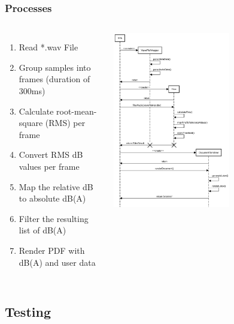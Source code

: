 \begin{frame}
    \frametitle{Processes}
    \begin{columns}
            \begin{enumerate}
                \item Read *.wav File
                \item Group samples into frames (duration of 300ms)
                \item Calculate root-mean-square (RMS) per frame
                \item Convert RMS dB values per frame
                \item Map the relative dB to absolute dB(A)
                \item Filter the resulting list of dB(A)
                \item Render PDF with dB(A) and user data
            \end{enumerate}
            \includegraphics[width=0.6\textwidth]{../assets/sequence_diagram_from_wave_file_to_pdf.png}
    \end{columns}
\end{frame}

\subsection{Testing}\label{subsec:testing}

